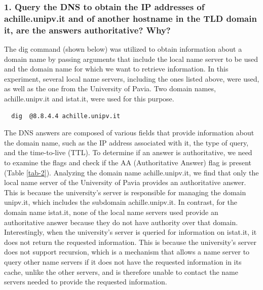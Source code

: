\documentclass[eng]{class}
\begin{document}
\subsubsection*{1. Query the DNS to obtain the IP addresses of achille.unipv.it and of another hostname in the TLD domain it, are the answers authoritative? Why?}
The dig command (shown below) was utilized to obtain information about a domain name by passing arguments that include the local name server
to be used and the domain name for which we want to retrieve information.
In this experiment, several local name servers, including the ones listed above, were used, as well as the one from the University of Pavia.
Two domain names, achille.unipv.it and istat.it, were used for this purpose.
\begin{lstlisting}
  dig  @8.8.4.4 achille.unipv.it
\end{lstlisting}
The DNS answers are composed of various fields that provide information about the domain name, such as the IP address associated with it,
the type of query, and the time-to-live (TTL). \newline
To determine if an answer is authoritative, we need to examine the flags and check if the AA (Authoritative Answer) flag is present (Table \ref*{tab-2}).
Analyzing the domain name achille.unipv.it, we find that only the local name server of the University of Pavia provides an authoritative answer.
This is because the university's server is responsible for managing the domain unipv.it, which includes the subdomain achille.unipv.it.
In contrast, for the domain name istat.it, none of the local name servers used provide an authoritative answer because they do not have authority over that domain.\newline
Interestingly, when the university's server is queried for information on istat.it, it does not return the requested information.
This is because the university's server does not support recursion, which  is a mechanism that allows a name server to query other name servers if it does not have the requested information in its cache, unlike the other servers,
and is therefore unable to contact the name servers needed to provide the requested information.
\end{document}
